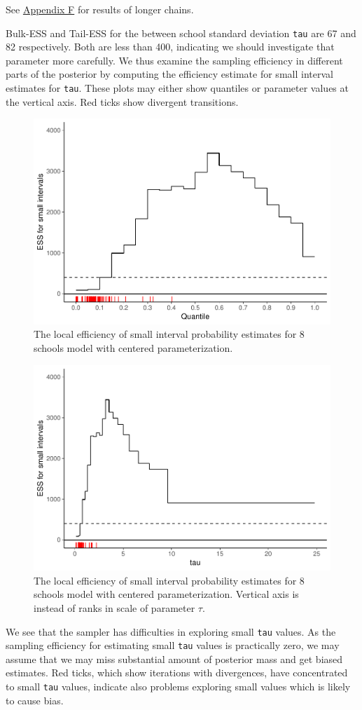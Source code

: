 \documentclass[american,]{article}
\begin{document}
See \protect\hyperlink{AppendixF}{Appendix F} for results of longer
chains.

Bulk-ESS and Tail-ESS for the between school standard deviation
\texttt{tau} are 67 and 82 respectively. Both are less than 400,
indicating we should investigate that parameter more carefully. We thus
examine the sampling efficiency in different parts of the posterior by
computing the efficiency estimate for small interval estimates for
\texttt{tau}. These plots may either show quantiles or parameter values
at the vertical axis. Red ticks show divergent transitions.

\begin{figure}[t]
  \centering
  \includegraphics[width=0.6\linewidth]{graphics/local-ess-fit-cp-1.pdf}
  \caption{The local efficiency of small interval probability estimates for 8 schools model with centered parameterization.}
\end{figure}

\begin{figure}[t]
  \centering
  \includegraphics[width=0.6\linewidth]{graphics/local-ess-fit-cp-norank-1.pdf}
  \caption{The local efficiency of small interval probability estimates for 8 schools model with centered parameterization. Vertical axis is instead of ranks in scale of parameter $\tau$.}
\end{figure}

We see that the sampler has difficulties in exploring small \texttt{tau}
values. As the sampling efficiency for estimating small \texttt{tau}
values is practically zero, we may assume that we may miss substantial
amount of posterior mass and get biased estimates. Red ticks, which show
iterations with divergences, have concentrated to small \texttt{tau}
values, indicate also problems exploring small values which is likely to
cause bias.
\end{document}
